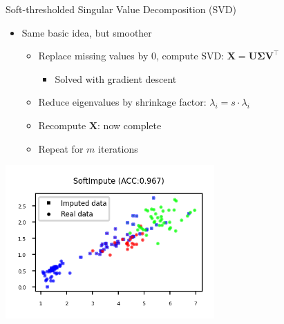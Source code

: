 \begin{frame}[allowframebreaks]{Soft-thresholded Singular Value Decomposition (SVD)}

\begin{itemize}
    \item Same basic idea, but smoother
    \begin{itemize}
        \item Replace missing values by 0, compute SVD: $\mathbf{X} = \mathbf{U} \mathbf{\Sigma} \mathbf{V}^\top$
        \begin{itemize}
            \item Solved with gradient descent
        \end{itemize}
        \item Reduce eigenvalues by shrinkage factor: $\lambda_i = s \cdot \lambda_i$
        \item Recompute $\mathbf{X}$: now complete
        \item Repeat for $m$ iterations
    \end{itemize}
\end{itemize}

\vspace{1em}

\begin{center}
    \includegraphics[width=0.6\textwidth]{images/pre-processing/softimpute.png}
\end{center}

\end{frame}


